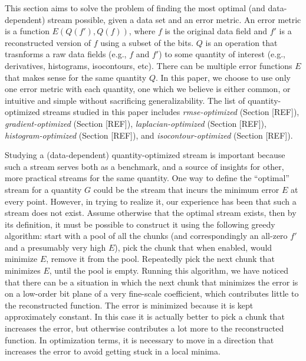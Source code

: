 This section aims to solve the problem of finding the most optimal (and data-dependent) stream
possible, given a data set and an error metric. An error metric is a function $E(Q(f'),Q(f))$, where
$f$ is the original data field and $f'$ is a reconstructed version of $f$ using a subset of the
bits. $Q$ is an operation that trasnforms a raw data fields (e.g., $f$ and $f'$) to some quantity of
interest (e.g., derivatives, histograms, isocontours, etc). There can be multiple error functions
$E$ that makes sense for the same quantity $Q$. In this paper, we choose to use only one error
metric with each quantity, one which we believe is either common, or intuitive and simple without
sacrificing generalizability. The list of quantity-optimized streams studied in this paper includes
\emph{rmse-optimized} (Section [REF]), \emph{gradient-optimized} (Section [REF]),
\emph{laplacian-optimized} (Section [REF]), \emph{histogram-optimized} (Section [REF]), and
\emph{isocontour-optimized} (Section [REF]).

Studying a (data-dependent) quantity-optimized stream is important because such a stream serves both
as a benchmark, and a source of insights for other, more practical streams for the same quantity.
One way to define the ``optimal'' stream for a quantity $G$ could be the stream that incurs the
minimum error $E$ at every point. However, in trying to realize it, our experience has been that
such a stream does not exist. Assume otherwise that the optimal stream exists, then by its
definition, it must be possible to construct it using the following greedy algorithm: start with a
pool of all the chunks (and correspondingly an all-zero $f'$ and a presumably very high $E$), pick
the chunk that when enabled, would minimize $E$, remove it from the pool. Repeatedly pick the next
chunk that minimizes $E$, until the pool is empty. Running this algorithm, we have noticed that
there can be a situation in which the next chunk that minimizes the error is on a low-order bit
plane of a very fine-scale coefficient, which contributes little to the reconstructed function. The
error is minimized because it is kept approximately constant. In this case it is actually better to
pick a chunk that increases the error, but otherwise contributes a lot more to the reconstructed
function. In optimization terms, it is necessary to move in a direction that increases the error to
avoid getting stuck in a local minima.

